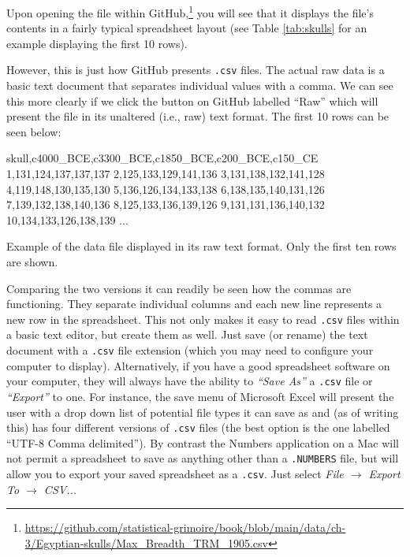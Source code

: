 Upon opening the file within GitHub,\footnote{\url{https://github.com/statistical-grimoire/book/blob/main/data/ch-3/Egyptian-skulls/Max_Breadth_TRM_1905.csv}} you will see that it displays the file's contents in a fairly typical spreadsheet layout (see Table \ref{tab:skulls} for an example displaying the first 10 rows).

\vspace{1em}



\vspace{1em}

\noindent
However, this is just how GitHub presents \texttt{.csv} files. The actual raw data is a basic text document that separates individual values with a comma. We can see this more clearly if we click the button on GitHub labelled ``Raw'' which will present the file in its unaltered (i.e., raw) text format. The first 10 rows can be seen below:

\vspace{1em}
\begin{listing}[H]
\begin{raw}
skull,c4000_BCE,c3300_BCE,c1850_BCE,c200_BCE,c150_CE
1,131,124,137,137,137
2,125,133,129,141,136
3,131,138,132,141,128
4,119,148,130,135,130
5,136,126,134,133,138
6,138,135,140,131,126
7,139,132,138,140,136
8,125,133,136,139,126
9,131,131,136,140,132
10,134,133,126,138,139
...
\end{raw}
\caption*{Example of the  data file displayed in its raw text format. Only the first ten rows are shown.}
\end{listing}

\vspace{1em}

Comparing the two versions it can readily be seen how the commas are functioning. They separate individual columns and each new line represents a new row in the spreadsheet. This not only makes it easy to read \texttt{.csv} files within a basic text editor, but create them as well. Just save (or rename) the text document with a \texttt{.csv} file extension (which you may need to configure your computer to display). Alternatively, if you have a good spreadsheet software on your computer, they will always have the ability to \textit{``Save As''} a \texttt{.csv} file or \textit{``Export''} to one. For instance, the save menu of Microsoft Excel will present the user with a drop down list of potential file types it can save as and (as of writing this) has four different versions of \texttt{.csv} files (the best option is the one labelled ``UTF-8 Comma delimited''). By contrast the Numbers application on a Mac will not permit a spreadsheet to save as anything other than a \texttt{.NUMBERS} file, but will allow you to export your saved spreadsheet as a \texttt{.csv}. Just select \textit{File $\rightarrow$ Export To $\rightarrow$ CSV... }

